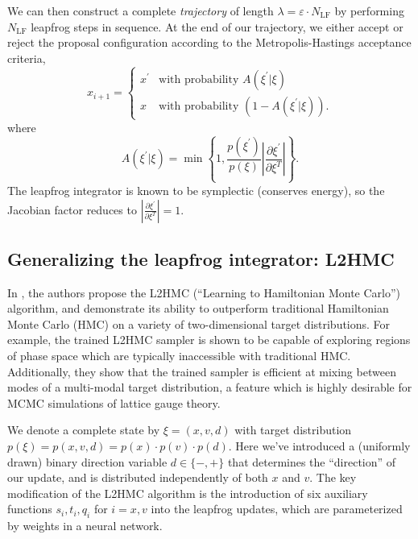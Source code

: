\documentclass{article} %
\begin{document}
%
We can then construct a complete \emph{trajectory} of length \(\lambda = \varepsilon\cdot N_{\mathrm{LF}}\) by
performing \(N_{\mathrm{LF}}\) leapfrog steps in sequence.
%
At the end of our trajectory, we either accept or reject the proposal configuration according to the Metropolis-Hastings
acceptance criteria,
%
\begin{equation}
   x_{i+1} =
   \begin{cases}%
      x^{\prime} &\mbox{with probability } A(\xi^{\prime}|\xi) \\
      x &\mbox{with probability } (1 - A(\xi^{\prime}|\xi)).
   \end{cases}
\end{equation}
%
where
%
\begin{equation}
   A(\xi^{\prime}|\xi) = \min\left\{%
      1,\frac{p(\xi^{\prime})}{p(\xi)}\left|%
      \frac{\partial\xi^{\prime}}{\partial\xi^{T}}
      \right|%
   \right\}.
   \label{eq:mh_criteria}
\end{equation}
%
The leapfrog integrator is known to be symplectic (conserves energy), so the Jacobian factor reduces to
\(\left|\frac{\partial\xi^{\prime}}{\partial\xi^{T}}\right| = 1\). 
%
%
\subsection{\label{sec:l2hmc}Generalizing the leapfrog integrator: L2HMC}
In \citep{levy2017}, the authors propose the L2HMC (``Learning to Hamiltonian Monte Carlo'') algorithm, and demonstrate
its ability to outperform traditional Hamiltonian Monte Carlo (HMC) on a variety of two-dimensional target
distributions.
%
For example, the trained L2HMC sampler is shown to be capable of exploring regions of phase space which are typically
inaccessible with traditional HMC.\@
%
Additionally, they show that the trained sampler is efficient at mixing between modes of a multi-modal target
distribution, a feature which is highly desirable for MCMC simulations of lattice gauge theory.
%

We denote a complete state by \(\xi = (x, v, d)\) with target distribution \(p(\xi) = p(x, v, d) = p(x)\cdot p(v)\cdot
p(d)\).
%
Here we've introduced a (uniformly drawn) binary direction variable \(d\in\{-,+\}\) that determines the ``direction'' of
our update, and is distributed independently of both \(x\) and \(v\).
%
The key modification of the L2HMC algorithm is the introduction of six auxiliary functions \(s_{i}, t_{i}, q_{i}\) for \(i
= x, v\) into the leapfrog updates, which are parameterized by weights in a neural network.
%
%
\end{document}
